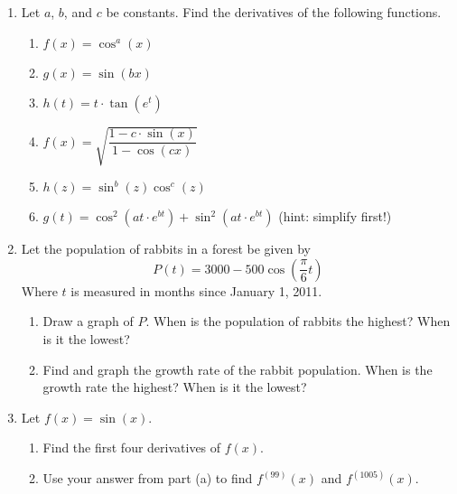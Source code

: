 \documentclass[11pt]{article}
\newcommand{\ds}{\displaystyle}
\begin{document}
\drawtitle

\begin{enumerate}

\item Let $a$, $b$, and $c$ be constants. Find the derivatives of the
  following functions.
  \begin{enumerate}
  \item $f(x)=\cos^a(x)$
    \vfill
  \item $g(x)=\sin(bx)$
    \vfill
    \newpage
  \item $\ds h(t)=t\cdot\tan\left(e^t\right)$
    \vfill
  \item $f(x)=\ds\sqrt{\dfrac{1-c\cdot\sin(x)}{1-\cos(cx)}}$
    \vfill
    \newpage
  \item $h(z)=\sin^b(z)\cos^c(z)$
    \vfill
  \item $\ds g(t)=\cos^2\left(at\cdot e^{bt}\right)+
    \sin^2\left(at\cdot e^{bt}\right)$ (hint: simplify first!)
    \vfill
  \end{enumerate}

\newpage

\item Let the population of rabbits in a forest be given by
  \[
  P(t)=3000-500\cos\left(\frac{\pi}{6}t\right)
  \]
  Where $t$ is measured in months since January 1, 2011.
  \begin{enumerate}
  \item Draw a graph of $P$.  When is the population of rabbits the
    highest?  When is it the lowest?
    \vfill
  \item Find and graph the growth rate of the rabbit population.  When
    is the growth rate the highest? When is it the lowest?
    \vfill
  \end{enumerate}

\newpage

\item Let $f(x)=\sin(x)$.
  \begin{enumerate}
  \item Find the first four derivatives of $f(x)$.
    \vfill
  \item Use your answer from part (a) to find $f^{(99)}(x)$ and
    $f^{(1005)}(x)$.
    \vfill
    \vspace{1in}
  \end{enumerate}

\end{enumerate}
\end{document}
